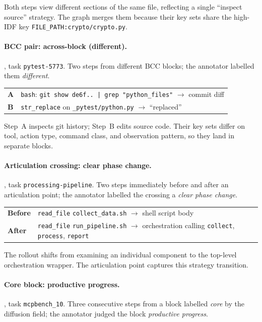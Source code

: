 \smallskip\noindent
Both steps view different sections of the same file, reflecting a single ``inspect source'' strategy.
The graph merges them because their key sets share the high-IDF key \texttt{FILE\_PATH:crypto/crypto.py}.

\paragraph{BCC pair: across-block (different).}
\swe{}, task \texttt{pytest-5773}.
Two steps from different BCC blocks; the annotator labelled them \emph{different}.

\smallskip\noindent\small
\begin{tabularx}{\linewidth}{@{}l@{\;\;}X@{}}
\textbf{A} & \texttt{bash}: \texttt{git show de6f.. | grep "python\_files"} $\to$ commit diff \\[2pt]
\textbf{B} & \texttt{str\_replace} on \texttt{\_pytest/python.py} $\to$ ``replaced'' \\
\end{tabularx}
\normalsize

\smallskip\noindent
Step~A inspects git history; Step~B edits source code.
Their key sets differ on tool, action type, command class, and observation pattern, so they land in separate blocks.

\paragraph{Articulation crossing: clear phase change.}
\terminal{}, task \texttt{processing-pipeline}.
Two steps immediately before and after an articulation point; the annotator labelled the crossing a \emph{clear phase change}.

\smallskip\noindent\small
\begin{tabularx}{\linewidth}{@{}l@{\;\;}X@{}}
\textbf{Before} & \texttt{read\_file} \texttt{collect\_data.sh} $\to$ shell script body \\[2pt]
\textbf{After} & \texttt{read\_file} \texttt{run\_pipeline.sh} $\to$ orchestration calling \texttt{collect}, \texttt{process}, \texttt{report} \\
\end{tabularx}
\normalsize

\smallskip\noindent
The rollout shifts from examining an individual component to the top-level orchestration wrapper.
The articulation point captures this strategy transition.

\paragraph{Core block: productive progress.}
\mcp{}, task \texttt{mcpbench\_10}.
Three consecutive steps from a block labelled \emph{core} by the diffusion field; the annotator judged the block \emph{productive progress}.

